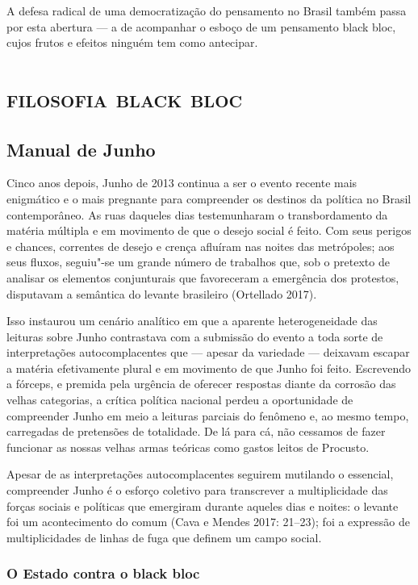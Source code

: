 A defesa radical de uma democratização do pensamento no Brasil também
passa por esta abertura --- a de acompanhar o esboço de um pensamento
black bloc, cujos frutos e efeitos ninguém tem como antecipar.

\part{\textsc{filosofia black bloc}}

\chapter{Manual de Junho}

Cinco anos depois, Junho de 2013 continua a ser o evento recente mais
enigmático e o mais pregnante para compreender os destinos da política
no Brasil contemporâneo. As ruas daqueles dias testemunharam o
transbordamento da matéria múltipla e em movimento de que o desejo
social é feito. Com seus perigos e chances, correntes de desejo e crença
afluíram nas noites das metrópoles; aos seus fluxos, seguiu"-se um grande
número de trabalhos que, sob o pretexto de analisar os elementos
conjunturais que favoreceram a emergência dos protestos, disputavam a
semântica do levante brasileiro (Ortellado 2017).

Isso instaurou um cenário analítico em que a aparente heterogeneidade
das leituras sobre Junho contrastava com a submissão do evento a toda
sorte de interpretações autocomplacentes que --- apesar da variedade ---
deixavam escapar a matéria efetivamente plural e em movimento de que
Junho foi feito. Escrevendo a fórceps, e premida pela urgência de
oferecer respostas diante da corrosão das velhas categorias, a crítica
política nacional perdeu a oportunidade de compreender Junho em meio a
leituras parciais do fenômeno e, ao mesmo tempo, carregadas de
pretensões de totalidade. De lá para cá, não cessamos de fazer funcionar
as nossas velhas armas teóricas como gastos leitos de Procusto.

Apesar de as interpretações autocomplacentes seguirem mutilando o
essencial, compreender Junho é o esforço coletivo para transcrever a
multiplicidade das forças sociais e políticas que emergiram durante
aqueles dias e noites: o levante foi um acontecimento do comum (Cava e
Mendes 2017: 21--23); foi a expressão de multiplicidades de linhas de
fuga que definem um campo social.

\section{O Estado contra o black bloc}

